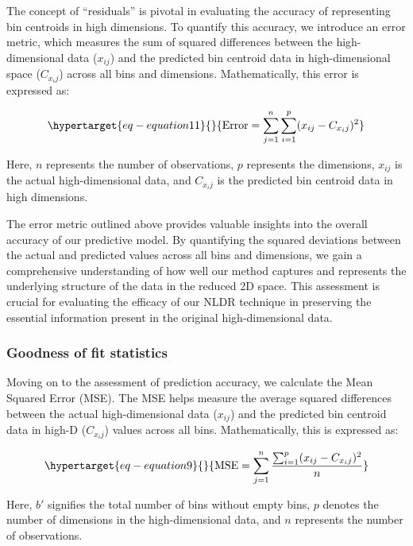 \documentclass[
  12pt]{article}
\begin{document}
The concept of ``residuals'' is pivotal in evaluating the accuracy of
representing bin centroids in high dimensions. To quantify this
accuracy, we introduce an error metric, which measures the sum of
squared differences between the high-dimensional data (\(x_{ij}\)) and
the predicted bin centroid data in high-dimensional space (\(C_{x_ij}\))
across all bins and dimensions. Mathematically, this error is expressed
as:

\begin{equation}\protect\hypertarget{eq-equation11}{}{
\text{Error} = \sum_{j = 1}^{n}\sum_{i = 1}^{p} (x_{ij} - C_{x_ij})^2
}\label{eq-equation11}\end{equation}

Here, \(n\) represents the number of observations, \(p\) represents the
dimensions, \(x_{ij}\) is the actual high-dimensional data, and
\(C_{x_ij}\) is the predicted bin centroid data in high dimensions.

The error metric outlined above provides valuable insights into the
overall accuracy of our predictive model. By quantifying the squared
deviations between the actual and predicted values across all bins and
dimensions, we gain a comprehensive understanding of how well our method
captures and represents the underlying structure of the data in the
reduced 2D space. This assessment is crucial for evaluating the efficacy
of our NLDR technique in preserving the essential information present in
the original high-dimensional data.

\hypertarget{sec-goodfit}{%
\subsubsection{Goodness of fit statistics}\label{sec-goodfit}}

Moving on to the assessment of prediction accuracy, we calculate the
Mean Squared Error (MSE). The MSE helps measure the average squared
differences between the actual high-dimensional data (\(x_{ij}\)) and
the predicted bin centroid data in high-D (\(C_{x_ij}\)) values across
all bins. Mathematically, this is expressed as:

\begin{equation}\protect\hypertarget{eq-equation9}{}{
\text{MSE} = \sum_{j = 1}^{n} \frac{\sum_{i = 1}^{p} (x_{ij} - C_{x_ij})^2}{n}
}\label{eq-equation9}\end{equation}

Here, \(b'\) signifies the total number of bins without empty bins,
\(p\) denotes the number of dimensions in the high-dimensional data, and
\(n\) represents the number of observations.
\end{document}
